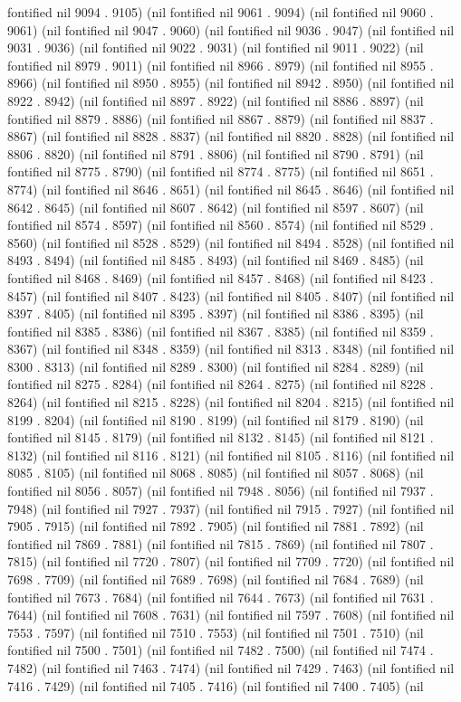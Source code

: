 fontified nil 9094 . 9105) (nil fontified nil 9061 . 9094) (nil fontified nil 9060 . 9061) (nil fontified nil 9047 . 9060) (nil fontified nil 9036 . 9047) (nil fontified nil 9031 . 9036) (nil fontified nil 9022 . 9031) (nil fontified nil 9011 . 9022) (nil fontified nil 8979 . 9011) (nil fontified nil 8966 . 8979) (nil fontified nil 8955 . 8966) (nil fontified nil 8950 . 8955) (nil fontified nil 8942 . 8950) (nil fontified nil 8922 . 8942) (nil fontified nil 8897 . 8922) (nil fontified nil 8886 . 8897) (nil fontified nil 8879 . 8886) (nil fontified nil 8867 . 8879) (nil fontified nil 8837 . 8867) (nil fontified nil 8828 . 8837) (nil fontified nil 8820 . 8828) (nil fontified nil 8806 . 8820) (nil fontified nil 8791 . 8806) (nil fontified nil 8790 . 8791) (nil fontified nil 8775 . 8790) (nil fontified nil 8774 . 8775) (nil fontified nil 8651 . 8774) (nil fontified nil 8646 . 8651) (nil fontified nil 8645 . 8646) (nil fontified nil 8642 . 8645) (nil fontified nil 8607 . 8642) (nil fontified nil 8597 . 8607) (nil fontified nil 8574 . 8597) (nil fontified nil 8560 . 8574) (nil fontified nil 8529 . 8560) (nil fontified nil 8528 . 8529) (nil fontified nil 8494 . 8528) (nil fontified nil 8493 . 8494) (nil fontified nil 8485 . 8493) (nil fontified nil 8469 . 8485) (nil fontified nil 8468 . 8469) (nil fontified nil 8457 . 8468) (nil fontified nil 8423 . 8457) (nil fontified nil 8407 . 8423) (nil fontified nil 8405 . 8407) (nil fontified nil 8397 . 8405) (nil fontified nil 8395 . 8397) (nil fontified nil 8386 . 8395) (nil fontified nil 8385 . 8386) (nil fontified nil 8367 . 8385) (nil fontified nil 8359 . 8367) (nil fontified nil 8348 . 8359) (nil fontified nil 8313 . 8348) (nil fontified nil 8300 . 8313) (nil fontified nil 8289 . 8300) (nil fontified nil 8284 . 8289) (nil fontified nil 8275 . 8284) (nil fontified nil 8264 . 8275) (nil fontified nil 8228 . 8264) (nil fontified nil 8215 . 8228) (nil fontified nil 8204 . 8215) (nil fontified nil 8199 . 8204) (nil fontified nil 8190 . 8199) (nil fontified nil 8179 . 8190) (nil fontified nil 8145 . 8179) (nil fontified nil 8132 . 8145) (nil fontified nil 8121 . 8132) (nil fontified nil 8116 . 8121) (nil fontified nil 8105 . 8116) (nil fontified nil 8085 . 8105) (nil fontified nil 8068 . 8085) (nil fontified nil 8057 . 8068) (nil fontified nil 8056 . 8057) (nil fontified nil 7948 . 8056) (nil fontified nil 7937 . 7948) (nil fontified nil 7927 . 7937) (nil fontified nil 7915 . 7927) (nil fontified nil 7905 . 7915) (nil fontified nil 7892 . 7905) (nil fontified nil 7881 . 7892) (nil fontified nil 7869 . 7881) (nil fontified nil 7815 . 7869) (nil fontified nil 7807 . 7815) (nil fontified nil 7720 . 7807) (nil fontified nil 7709 . 7720) (nil fontified nil 7698 . 7709) (nil fontified nil 7689 . 7698) (nil fontified nil 7684 . 7689) (nil fontified nil 7673 . 7684) (nil fontified nil 7644 . 7673) (nil fontified nil 7631 . 7644) (nil fontified nil 7608 . 7631) (nil fontified nil 7597 . 7608) (nil fontified nil 7553 . 7597) (nil fontified nil 7510 . 7553) (nil fontified nil 7501 . 7510) (nil fontified nil 7500 . 7501) (nil fontified nil 7482 . 7500) (nil fontified nil 7474 . 7482) (nil fontified nil 7463 . 7474) (nil fontified nil 7429 . 7463) (nil fontified nil 7416 . 7429) (nil fontified nil 7405 . 7416) (nil fontified nil 7400 . 7405) (nil 